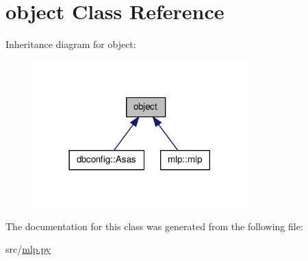 \hypertarget{classobject}{
\section{object Class Reference}
\label{classobject}
}


Inheritance diagram for object:\nopagebreak
\begin{figure}[H]
\begin{center}
\leavevmode
\includegraphics[width=234pt]{classobject__inherit__graph}
\end{center}
\end{figure}


The documentation for this class was generated from the following file:\begin{DoxyCompactItemize}
\item 
src/\hyperlink{mlp_8py}{mlp.py}\end{DoxyCompactItemize}
